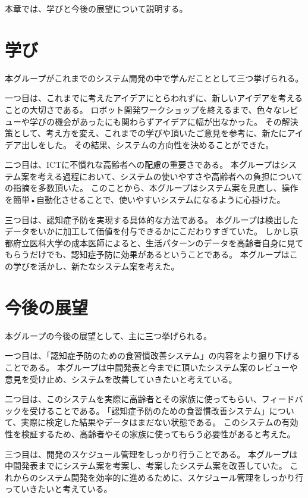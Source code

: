\documentclass[../report]{subfiles}
\begin{document}
本章では、学びと今後の展望について説明する。

\section{学び}
本グループがこれまでのシステム開発の中で学んだこととして三つ挙げられる。

一つ目は、これまでに考えたアイデアにとらわれずに、新しいアイデアを考えることの大切さである。
ロボット開発ワークショップを終えるまで、色々なレビューや学びの機会があったにも関わらずアイデアに幅が出なかった。
その解決策として、考え方を変え、これまでの学びや頂いたご意見を参考に、新たにアイデア出しをした。
その結果、システムの方向性を決めることができた。

二つ目は、ICTに不慣れな高齢者への配慮の重要さである。
本グループはシステム案を考える過程において、システムの使いやすさや高齢者への負担についての指摘を多数頂いた。
このことから、本グループはシステム案を見直し、操作を簡単•自動化させることで、使いやすいシステムになるように心掛けた。

三つ目は、認知症予防を実現する具体的な方法である。
本グループは検出したデータをいかに加工して価値を付与できるかにこだわりすぎていた。
しかし京都府立医科大学の成本医師によると、生活パターンのデータを高齢者自身に見てもらうだけでも、認知症予防に効果があるということである。
本グループはこの学びを活かし、新たなシステム案を考えた。


\section{今後の展望}
本グループの今後の展望として、主に三つ挙げられる。

一つ目は、｢認知症予防のための食習慣改善システム」の内容をより掘り下げることである。
本グループは中間発表と今までに頂いたシステム案のレビューや意見を受け止め、システムを改善していきたいと考えている。

二つ目は、このシステムを実際に高齢者とその家族に使ってもらい、フィードバックを受けることである。
｢認知症予防のための食習慣改善システム」について、実際に検定した結果やデータはまだない状態である。
このシステムの有効性を検証するため、高齢者やその家族に使ってもらう必要性があると考えた。

三つ目は、開発のスケジュール管理をしっかり行うことである。
本グループは中間発表までにシステム案を考案し、考案したシステム案を改善していた。
これからのシステム開発を効率的に進めるために、スケジュール管理をしっかり行っていきたいと考えている。
\end{document}
